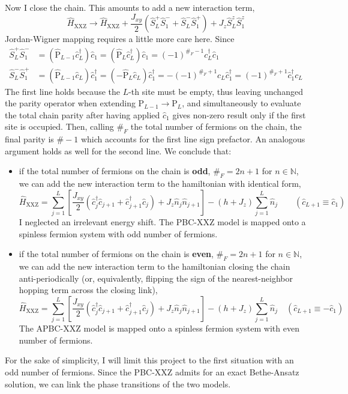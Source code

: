Now I close the chain. This amounts to add a new interaction term,
\[
	\hat H_\mathrm{XXZ} \to \hat H_\mathrm{XXZ} + \frac{J_{xy}}{2} \left( 
		\hat S_L^+ \hat S_1^- + \hat S_L^- \hat S_1^+
	\right) + J_z \hat S_L^z \hat S_1^z
\]
Jordan-Wigner mapping requires a little more care here. Since
\[
	\begin{aligned}
		\hat S_L^+ \hat S_1^- &= \left(
			\hat{\mathrm{P}}_{L-1} \hat c_L^\dagger
		\right) \hat c_1 = \left(
			\hat{\mathrm{P}}_L \hat c_L^\dagger
		\right) \hat c_1 = (-1)^{\#_F -1} c_L^\dagger \hat c_1 \\
		\hat S_L^- \hat S_1^+ &= \left(
			\hat{\mathrm{P}}_{L-1} \hat c_L
		\right) \hat c_1^\dagger = \left(
			-\hat{\mathrm{P}}_L \hat c_L
		\right) \hat c_1^\dagger = -(-1)^{\#_F+1} c_L \hat c_1^\dagger = (-1)^{\#_F+1} \hat c_1^\dagger c_L
	\end{aligned}
\]
The first line holds because the $L$-th site must be empty, thus leaving unchanged the parity operator when extending $\mathrm{P}_{L-1} \to \mathrm{P}_L$, and simultaneously to evaluate the total chain parity after having applied $\hat c_1$ gives non-zero result only if the first site is occupied. Then, calling $\#_F$ the total number of fermions on the chain, the final parity is $\#-1$ which accounts for the first line sign prefactor. An analogous argument holds as well for the second line. We conclude that:
\begin{itemize}
	\item if the total number of fermions on the chain is \textbf{odd}, $\#_F = 2n+1$ for $n \in \mathbb{N}$, we can add the new interaction term to the hamiltonian with identical form,
	\begin{equation}\label{eq:xxz-hamiltonian-intermediate}
		\hat H_\mathrm{XXZ} = \sum_{j=1}^L \left[
			\frac{J_{xy}}{2} \left(
				\hat c_j^\dagger \hat c_{j+1} + \hat c_{j+1}^\dagger \hat c_j
			\right) + J_z \hat n_j \hat n_{j+1}
		\right] - (h+J_z) \sum_{j=1}^L \hat n_{j}
		\qquad
		\left(
			\hat c_{L+1} \equiv \hat c_1
		\right)
	\end{equation}
	I neglected an irrelevant energy shift. The PBC-$\mathrm{XXZ}$ model is mapped onto a spinless fermion system with odd number of fermions.
	\item if the total number of fermions on the chain is \textbf{even}, $\#_F = 2n+1$ for $n \in \mathbb{N}$, we can add the new interaction term to the hamiltonian closing the chain anti-periodically (or, equivalently, flipping the sign of the nearest-neighbor hopping term across the closing link),
	\[
		\hat H_\mathrm{XXZ} = \sum_{j=1}^L \left[
		\frac{J_{xy}}{2} \left(
				\hat c_j^\dagger \hat c_{j+1} + \hat c_{j+1}^\dagger \hat c_j
			\right) + J_z \hat n_j \hat n_{j+1}
		\right] - (h+J_z) \sum_{j=1}^L \hat n_{j}
		\quad
		\left(
			\hat c_{L+1} \equiv - \hat c_1
		\right)
	\]
	The APBC-$\mathrm{XXZ}$ model is mapped onto a spinless fermion system with even number of fermions.
\end{itemize}
For the sake of simplicity, I will limit this project to the first situation with an odd number of fermions. Since the PBC-$\mathrm{XXZ}$ admits for an exact Bethe-Ansatz solution, we can link the phase transitions of the two models.

